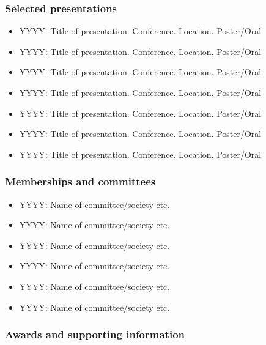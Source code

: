 \documentclass[11pt, a4paper]{article}
\providecommand{\tightlist}{%
  \setlength{\itemsep}{0pt}\setlength{\parskip}{0pt}}
\begin{document}
\begin{raggedright}
\hypertarget{selected-presentations}{%
\subsubsection{Selected presentations}\label{selected-presentations}}

\begin{itemize}
\tightlist
\item
  YYYY: Title of presentation. Conference. Location. Poster/Oral
\item
  YYYY: Title of presentation. Conference. Location. Poster/Oral
\item
  YYYY: Title of presentation. Conference. Location. Poster/Oral
\item
  YYYY: Title of presentation. Conference. Location. Poster/Oral
\item
  YYYY: Title of presentation. Conference. Location. Poster/Oral
\item
  YYYY: Title of presentation. Conference. Location. Poster/Oral
\item
  YYYY: Title of presentation. Conference. Location. Poster/Oral
\end{itemize}

\hypertarget{memberships-and-committees}{%
\subsubsection{Memberships and
committees}\label{memberships-and-committees}}

\begin{itemize}
\tightlist
\item
  YYYY: Name of committee/society etc.
\item
  YYYY: Name of committee/society etc.
\item
  YYYY: Name of committee/society etc.
\item
  YYYY: Name of committee/society etc.
\item
  YYYY: Name of committee/society etc.
\item
  YYYY: Name of committee/society etc.
\end{itemize}

\hypertarget{awards-and-supporting-information}{%
\subsubsection{Awards and supporting
information}\label{awards-and-supporting-information}}


\end{raggedright}
\end{document}
